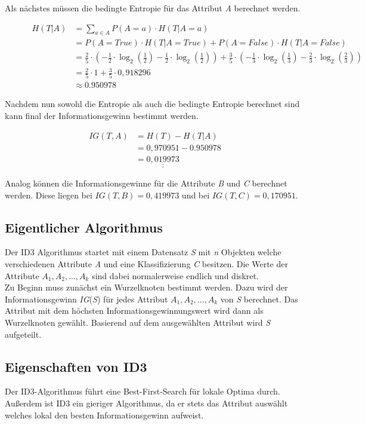 Als nächstes müssen die bedingte Entropie für das Attribut \textit{A} berechnet werden. \autocites{BedingteEntropie:online}{ConditionalEntropy:online}

\begin{figure}[htbp]
    \centering
    \begin{align*}
        H(T\vert A) &= \sum\limits_{a\in A}P(A=a) \cdot H(T\vert A=a) \\
                    &= P(A=True) \cdot H(T\vert A=True) + P(A=False) \cdot H(T\vert A=False) \\
                    &= \frac{2}{5} \cdot \left( -\frac{1}{2} \cdot \log_2\left( \frac{1}{2} \right) - \frac{1}{2} \cdot \log_{2}\left( \frac{1}{2} \right) \right) + \frac{3}{5} \cdot \left( -\frac{1}{3} \cdot \log_{2}\left( \frac{1}{3} \right) - \frac{2}{3} \cdot \log_{2}\left( \frac{2}{3} \right) \right) \\
                    &= \frac{2}{5} \cdot 1 + \frac{3}{5} \cdot 0,918296\\
                    &\approx 0.950978
    \end{align*}
\end{figure}

Nachdem nun sowohl die Entropie als auch die bedingte Entropie berechnet sind kann final der Informationsgewinn bestimmt werden.

\begin{figure}[h]
    \vspace{0.5cm}
    \centering
    \begin{align*}
        IG(T,A) &= H(T) - H(T\vert A) \\
                &= 0,970951 - 0.950978 \\
                &= \underline{\underline{0,019973}}
    \end{align*}
\end{figure}

Analog können die Informationsgewinne für die Attribute \textit{B} und \textit{C} berechnet werden. Diese liegen bei $ IG(T, B) = 0,419973 $ und bei $ IG(T, C) = 0,170951 $.

\subsection{Eigentlicher Algorithmus}
Der ID3 Algorithmus startet mit einem Datensatz \textit{S} mit \textit{n} Objekten welche  verschiedenen Attribute \textit{A} und eine Klassifizierung \textit{C} besitzen. \autocites{ImplementationID3}{QuinlanID3} Die Werte der Attribute $A_{1},A_{2},...,A_{k}$ sind dabei normalerweise endlich und diskret. \autocite{ThailandID3}\\
Zu Beginn muss zunächst ein Wurzelknoten bestimmt werden. Dazu wird der Informationsgewinn \textit{IG}(\textit{S}) für jedes Attribut $A_{1},A_{2},...,A_{k}$ von \textit{S} berechnet. Das Attribut mit dem höchsten Informationsgewinnungswert wird dann als Wurzelknoten gewählt. Basierend auf dem ausgewählten Attribut wird \textit{S} aufgeteilt.

\subsection{Eigenschaften von ID3}
\label{id3:eigenschaften}
Der ID3-Algorithmus führt eine Best-First-Search für lokale Optima durch. Außerdem ist ID3 ein gieriger Algorithmus, da er stets das Attribut auswählt welches lokal den besten Informationsgewinn aufweist.